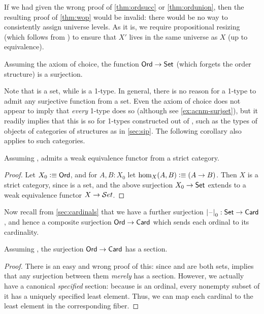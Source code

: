 \begin{rmk}
  If we had given the wrong proof of \cref{thm:ordsucc} or \cref{thm:ordunion}, then the resulting proof of \cref{thm:wop} would be invalid: there would be no way to consistently assign universe levels.
  As it is, we require propositional resizing (which follows from \LEM{}) to ensure that $X'$ lives in the same universe as $X$ (up to equivalence).
\end{rmk}

\begin{cor}
  Assuming the axiom of choice, the function $\mathsf{Ord}\to\mathsf{Set}$ (which forgets the order structure) is a surjection.
\end{cor}

Note that \ord is a set, while \set is a 1-type.
In general, there is no reason for a 1-type to admit any surjective function from a set.
Even the axiom of choice does not appear to imply that \emph{every} 1-type does so (although see \cref{ex:acnm-surjset}), but it readily implies that this is so for 1-types constructed out of \set, such as the types of objects of categories of structures as in \cref{sec:sip}.
The following corollary also applies to such categories.

\begin{cor}
  Assuming \choice{}, \uset admits a weak equivalence functor from a strict category.
\end{cor}
\begin{proof}
  Let $X_0\vcentcolon\equiv \mathsf{Ord}$, and for $A,B:X_0$ let $\hom_X(A,B) \vcentcolon\equiv (A\to B)$.
  Then $X$ is a strict category, since \ord is a set, and the above surjection $X_0 \to \mathsf{Set}$ extends to a weak equivalence functor $X\to \mathcal{S}et$.
\end{proof}

Now recall from \cref{sec:cardinals} that we have a further surjection $\mathopen{}\left|\mathord{\hspace{1pt}\text{--}\hspace{1pt}}\right|_{0}^{}\mathclose{}:\mathsf{Set}\to\mathsf{Card}$, and hence a composite surjection $\mathsf{Ord}\to\mathsf{Card}$ which sends each ordinal to its cardinality.

\begin{thm}
  Assuming \choice{}, the surjection $\mathsf{Ord}\to\mathsf{Card}$ has a section.
\end{thm}
\begin{proof}
  There is an easy and wrong proof of this: since \ord and \card are both sets, \choice{} implies that any surjection between them \emph{merely} has a section.
  However, we actually have a canonical \emph{specified} section: because \ord is an ordinal, every nonempty subset of it has a uniquely specified least element.
  Thus, we can map each cardinal to the least element in the corresponding fiber.
\end{proof}

